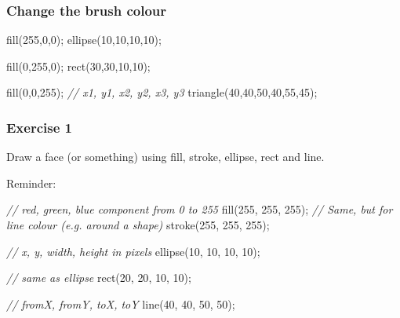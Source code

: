 \documentclass[ignorenonframetext,]{beamer}
\newenvironment{Shaded}{}{}
\newcommand{\DecValTok}[1]{\textcolor[rgb]{0.25,0.63,0.44}{{#1}}}
\newcommand{\CommentTok}[1]{\textcolor[rgb]{0.38,0.63,0.69}{\textit{{#1}}}}
\newcommand{\FunctionTok}[1]{\textcolor[rgb]{0.02,0.16,0.49}{{#1}}}
\newcommand{\NormalTok}[1]{{#1}}
\begin{document}
\begin{frame}[fragile]\frametitle{Change the brush colour}

\begin{Shaded}
\begin{Highlighting}[]
\FunctionTok{fill}\NormalTok{(}\DecValTok{255}\NormalTok{,}\DecValTok{0}\NormalTok{,}\DecValTok{0}\NormalTok{);}
\FunctionTok{ellipse}\NormalTok{(}\DecValTok{10}\NormalTok{,}\DecValTok{10}\NormalTok{,}\DecValTok{10}\NormalTok{,}\DecValTok{10}\NormalTok{);}

\FunctionTok{fill}\NormalTok{(}\DecValTok{0}\NormalTok{,}\DecValTok{255}\NormalTok{,}\DecValTok{0}\NormalTok{);}
\FunctionTok{rect}\NormalTok{(}\DecValTok{30}\NormalTok{,}\DecValTok{30}\NormalTok{,}\DecValTok{10}\NormalTok{,}\DecValTok{10}\NormalTok{);}

\FunctionTok{fill}\NormalTok{(}\DecValTok{0}\NormalTok{,}\DecValTok{0}\NormalTok{,}\DecValTok{255}\NormalTok{);}
\CommentTok{// x1, y1, x2, y2, x3, y3}
\FunctionTok{triangle}\NormalTok{(}\DecValTok{40}\NormalTok{,}\DecValTok{40}\NormalTok{,}\DecValTok{50}\NormalTok{,}\DecValTok{40}\NormalTok{,}\DecValTok{55}\NormalTok{,}\DecValTok{45}\NormalTok{);}
\end{Highlighting}
\end{Shaded}

\end{frame}

\begin{frame}[fragile]\frametitle{Exercise 1}

Draw a face (or something) using fill, stroke, ellipse, rect and line.

Reminder:

\begin{Shaded}
\begin{Highlighting}[]
\CommentTok{// red, green, blue component from 0 to 255}
\FunctionTok{fill}\NormalTok{(}\DecValTok{255}\NormalTok{, }\DecValTok{255}\NormalTok{, }\DecValTok{255}\NormalTok{);}
\CommentTok{// Same, but for line colour (e.g. around a shape)}
\FunctionTok{stroke}\NormalTok{(}\DecValTok{255}\NormalTok{, }\DecValTok{255}\NormalTok{, }\DecValTok{255}\NormalTok{);}

\CommentTok{// x, y, width, height in pixels}
\FunctionTok{ellipse}\NormalTok{(}\DecValTok{10}\NormalTok{, }\DecValTok{10}\NormalTok{, }\DecValTok{10}\NormalTok{, }\DecValTok{10}\NormalTok{);}

\CommentTok{// same as ellipse}
\FunctionTok{rect}\NormalTok{(}\DecValTok{20}\NormalTok{, }\DecValTok{20}\NormalTok{, }\DecValTok{10}\NormalTok{, }\DecValTok{10}\NormalTok{);}

\CommentTok{// fromX, fromY, toX, toY}
\FunctionTok{line}\NormalTok{(}\DecValTok{40}\NormalTok{, }\DecValTok{40}\NormalTok{, }\DecValTok{50}\NormalTok{, }\DecValTok{50}\NormalTok{);}
\end{Highlighting}
\end{Shaded}

\end{frame}
\end{document}
